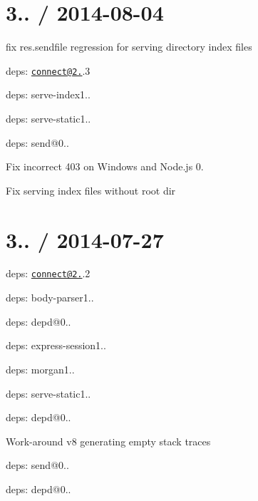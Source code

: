 \section*{3.. / 2014-\/08-\/04 }


\begin{DoxyItemize}
\item fix {\ttfamily res.\+sendfile} regression for serving directory index files
\item deps\+: \href{mailto:connect@2.24}{\tt connect@2.}.3
\begin{DoxyItemize}
\item deps\+: serve-\/index1..
\item deps\+: serve-\/static1..
\end{DoxyItemize}
\item deps\+: send@0..
\begin{DoxyItemize}
\item Fix incorrect 403 on Windows and Node.\+js 0.
\item Fix serving index files without root dir
\end{DoxyItemize}
\end{DoxyItemize}

\section*{3.. / 2014-\/07-\/27 }


\begin{DoxyItemize}
\item deps\+: \href{mailto:connect@2.24}{\tt connect@2.}.2
\begin{DoxyItemize}
\item deps\+: body-\/parser1..
\item deps\+: depd@0..
\item deps\+: express-\/session1..
\item deps\+: morgan1..
\item deps\+: serve-\/static1..
\end{DoxyItemize}
\item deps\+: depd@0..
\begin{DoxyItemize}
\item Work-\/around v8 generating empty stack traces
\end{DoxyItemize}
\item deps\+: send@0..
\begin{DoxyItemize}
\item deps\+: depd@0..
\end{DoxyItemize}
\end{DoxyItemize}

